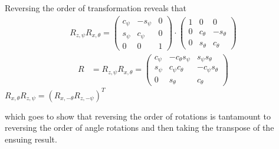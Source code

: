 \begin{solution}
	Reversing the order of transformation reveals that
	\begin{align}
 R_{z, \psi} R_{x, \theta}=
	\left(\begin{array}{ccc}
	c_\psi & -s_\psi & 0 \\
	s_\psi & c_\psi & 0 \\
	0 & 0 & 1
	\end{array}\right)
	\cdot
	 \left(\begin{array}{ccc}
	1 & 0 & 0 \\
	0 & c_\theta & -s_\theta \\
	0 & s_\theta & c_\theta
	\end{array}\right) 
	\end{align}
	\begin{align}
		R &=  R_{z, \psi} R_{x, \theta} = \left(\begin{array}{ccc}
		c_\psi & -c_\theta s_\psi & s_\psi s_\theta \\
		s_\psi & c_\psi c_\theta  & - c_\psi s_\theta \\
		0 & s_\theta & c_\theta
		\end{array}\right)
	\end{align}
	\ie $R_{x, \theta} R_{z, \psi} = (R_{x, -\theta} R_{z, -\psi})^T $
\end{solution}
%
which goes to show that reversing the order of rotations is tantamount to reversing the order of angle rotations and then taking the transpose of the ensuing result. 